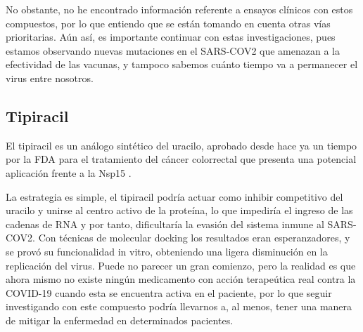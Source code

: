 \documentclass[12pt]{article}
\begin{document}
No obstante, no he encontrado información referente a ensayos clínicos con estos compuestos, por lo que entiendo que se están tomando en cuenta otras vías prioritarias. Aún así, es importante continuar con estas investigaciones, pues estamos observando nuevas mutaciones en el SARS-COV2 que amenazan a la efectividad de las vacunas, y tampoco sabemos cuánto tiempo va a permanecer el virus entre nosotros.

\subsection{Tipiracil}
El tipiracil es un análogo sintético del uracilo, aprobado desde hace ya un tiempo por la FDA para el tratamiento del cáncer colorrectal que presenta una potencial aplicación frente a la Nsp15 \cite{Kim2020.06.26.173872}.
\newline

La estrategia es simple, el tipiracil podría actuar como inhibir competitivo del uracilo y unirse al centro activo de la proteína, lo que impediría el ingreso de las cadenas de RNA y por tanto, dificultaría la evasión del sistema inmune al SARS-COV2. Con técnicas de molecular docking los resultados eran esperanzadores, y se provó su funcionalidad in vitro, obteniendo una ligera disminución en la replicación del virus. Puede no parecer un gran comienzo, pero la realidad es que ahora mismo no existe ningún medicamento con acción terapeútica real contra la COVID-19 cuando esta se encuentra activa en el paciente, por lo que seguir investigando con este compuesto podría llevarnos a, al menos, tener una manera de mitigar la enfermedad en determinados pacientes. 
\newline
\end{document}
